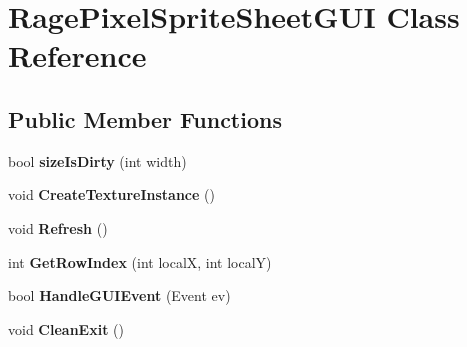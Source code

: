 \hypertarget{class_rage_pixel_sprite_sheet_g_u_i}{\section{Rage\-Pixel\-Sprite\-Sheet\-G\-U\-I Class Reference}
\label{class_rage_pixel_sprite_sheet_g_u_i}
}
\subsection*{Public Member Functions}
\begin{DoxyCompactItemize}
\item 
\hypertarget{class_rage_pixel_sprite_sheet_g_u_i_a4bada9440adbd3700c363d29506773b5}{bool {\bfseries size\-Is\-Dirty} (int width)}\label{class_rage_pixel_sprite_sheet_g_u_i_a4bada9440adbd3700c363d29506773b5}

\item 
\hypertarget{class_rage_pixel_sprite_sheet_g_u_i_a52024c4d21cdaab9df2a9b6a4481712d}{void {\bfseries Create\-Texture\-Instance} ()}\label{class_rage_pixel_sprite_sheet_g_u_i_a52024c4d21cdaab9df2a9b6a4481712d}

\item 
\hypertarget{class_rage_pixel_sprite_sheet_g_u_i_ab9b95d2818a676750bf3c4b4a3744c20}{void {\bfseries Refresh} ()}\label{class_rage_pixel_sprite_sheet_g_u_i_ab9b95d2818a676750bf3c4b4a3744c20}

\item 
\hypertarget{class_rage_pixel_sprite_sheet_g_u_i_abb80ff910b04223d9cc746147218d791}{int {\bfseries Get\-Row\-Index} (int local\-X, int local\-Y)}\label{class_rage_pixel_sprite_sheet_g_u_i_abb80ff910b04223d9cc746147218d791}

\item 
\hypertarget{class_rage_pixel_sprite_sheet_g_u_i_a7be13e1e873d750f201124b74aace1af}{bool {\bfseries Handle\-G\-U\-I\-Event} (Event ev)}\label{class_rage_pixel_sprite_sheet_g_u_i_a7be13e1e873d750f201124b74aace1af}

\item 
\hypertarget{class_rage_pixel_sprite_sheet_g_u_i_aecfb82941eebcc8c8647463851acdf8c}{void {\bfseries Clean\-Exit} ()}\label{class_rage_pixel_sprite_sheet_g_u_i_aecfb82941eebcc8c8647463851acdf8c}

\end{DoxyCompactItemize}

